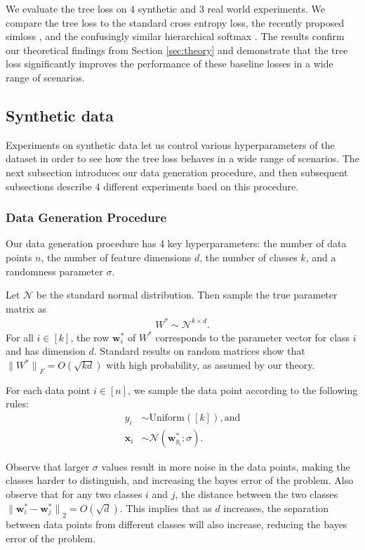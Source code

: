 \documentclass[twoside]{article}
\renewcommand{\star}[1]{{#1}^{*}}
\newcommand{\w}{\mathbf w}
\newcommand{\x}{\mathbf x}
\newcommand{\ltwo}[1]{{\lVert {#1} \rVert}_2}
\newcommand{\lF}[1]{{\lVert {#1} \rVert}_F}
\begin{document}
We evaluate the tree loss on 4 synthetic and 3 real world experiments.
We compare the tree loss to the standard cross entropy loss, the recently proposed simloss \citep{Kobs2020SimLossCS}, and the confusingly similar hierarchical softmax \citep{morin2005hierarchical}.
The results confirm our theoretical findings from Section \ref{sec:theory} and demonstrate that the tree loss significantly improves the performance of these baseline losses in a wide range of scenarios.

\subsection{Synthetic data}

Experiments on synthetic data let us control various hyperparameters of the dataset in order to see how the tree loss behaves in a wide range of scenarios.
The next subsection introduces our data generation procedure,
and then subsequent subsections describe 4 different experiments baed on this procedure.

\subsubsection{Data Generation Procedure}
\label{sec:exp:synth:problem}

Our data generation procedure has 4 key hyperparameters:
the number of data points $n$, the number of feature dimensions $d$, the number of classes $k$, and a randomness parameter $\sigma$.

Let $\mathcal N$ be the standard normal distribution.
Then sample the true parameter matrix as
\begin{align}
    \star W \sim \mathcal N^{k\times d}
    .
\end{align}
For all $i \in [k]$, the row $\w_i^*$ of $W^*$ corresponds to the parameter vector for class $i$ and has dimension $d$.
Standard results on random matrices show that $\lF{\star W} = O(\sqrt{kd})$ with high probability, as assumed by our theory.

For each data point $i\in[n]$,
we sample the data point according to the following rules:
\begin{align}
    y_i &\sim \text{Uniform}([k]), \text{and} \\
    \x_{i} &\sim \mathcal N(\w^*_{y_i}; \sigma).
\end{align}

Observe that larger $\sigma$ values result in
more noise in the data points,
making the classes harder to distinguish,
and increasing the bayes error of the problem.
Also observe that for any two classes $i$ and $j$,
the distance between the two classes $\ltwo{\star\w_i - \star\w_j} = O(\sqrt{d})$.
This implies that as $d$ increases,
the separation between data points from different classes will also increase,
reducing the bayes error of the problem.
\end{document}
